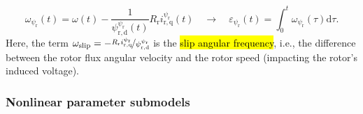 \begin{frame}
    \begin{equation}
        \omega_{\psi_{\mathrm{r}}}(t) = \omega(t) - \frac{1}{\psi_{\mathrm{r,d}}^{\psi_{\mathrm{r}}}(t)} R_\mathrm{r} i_{\mathrm{r,q}}^{\psi_{\mathrm{r}}}(t) \quad \rightarrow \quad \varepsilon_{\psi_{\mathrm{r}}}(t) = \int_0^t \omega_{\psi_{\mathrm{r}}}(\tau) \mathrm{d}\tau.
        \label{eq:IM_model_k_rotor_flux_orientation_angular_velocity}
    \end{equation}\pause%
    Here, the term $\omega_\mathrm{slip} = -\nicefrac{R_\mathrm{r} i_{\mathrm{r,q}}^{\psi_{\mathrm{r}}}}{\psi_{\mathrm{r,d}}^{\psi_{\mathrm{r}}}} $ is the \hl{slip angular frequency}, i.e., the difference between the rotor flux angular velocity and the rotor speed (impacting the rotor's induced voltage).
\end{frame}

\subsubsection{Nonlinear parameter submodels}

